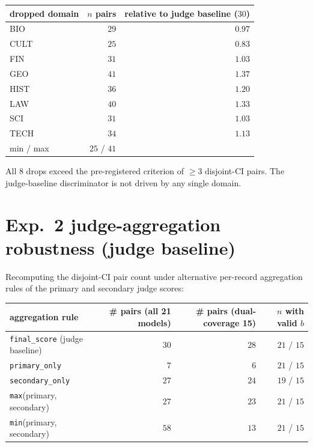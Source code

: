 \documentclass{article}
\newcommand{\sdi}{\ensuremath{b}}
\begin{document}
\begin{center}
\small
\begin{tabular}{l r r}
\toprule
dropped domain & $n$ pairs & relative to judge baseline ($30$) \\
\midrule
BIO   & $29$ & $0.97$ \\
CULT  & $25$ & $0.83$ \\
FIN   & $31$ & $1.03$ \\
GEO   & $41$ & $1.37$ \\
HIST  & $36$ & $1.20$ \\
LAW   & $40$ & $1.33$ \\
SCI   & $31$ & $1.03$ \\
TECH  & $34$ & $1.13$ \\
\midrule
min / max & $25$ / $41$ & \\
\bottomrule
\end{tabular}
\end{center}

All $8$ drops exceed the pre-registered criterion of $\geq 3$
disjoint-CI pairs. The judge-baseline discriminator is not driven by
any single domain.

\section{Exp.~2 judge-aggregation robustness (judge baseline)}\label{app:judge_robustness}

Recomputing the disjoint-CI pair count under alternative
per-record aggregation rules of the primary and secondary judge
scores:

\begin{center}
\small
\begin{tabular}{l r r r}
\toprule
aggregation rule & \# pairs (all 21 models) & \# pairs (dual-coverage 15) & $n$ with valid \sdi{} \\
\midrule
\texttt{final\_score} (judge baseline) & $30$ & $28$ & $21$ / $15$ \\
\texttt{primary\_only}               & $7$  & $6$  & $21$ / $15$ \\
\texttt{secondary\_only}             & $27$ & $24$ & $19$ / $15$ \\
\texttt{max}(primary, secondary)     & $27$ & $23$ & $21$ / $15$ \\
\texttt{min}(primary, secondary)     & $58$ & $13$ & $21$ / $15$ \\
\bottomrule
\end{tabular}
\end{center}
\end{document}
